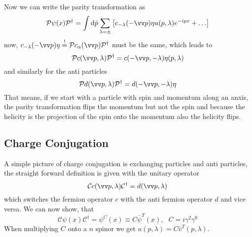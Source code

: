 Now we can write the parity transformation as
\[ \mathcal{P} \psi(x) \mathcal{P}^\dagger = \int \dd \tilde p \sum_{\lambda = \pm} \left[ c_{-\lambda} (-\vp) \eta u(p, \lambda) e^{-ipx} + \ldots\right]\]
now, $c_{-\lambda}(-\vp) \eta \soll \mathcal{P} c_\alpha(\vp) \mathcal{P}^\dagger$ must be the same, which leads to
\[ \mathcal{P} c(\vp , \lambda) \mathcal{P}^\dagger = c(-\vp, -\lambda) \eta(p, \lambda)\]
and similarly for the anti particles
\[ \mathcal{P} d( \vp, \lambda) \mathcal{P}^\dagger = d(-\vp, -\lambda) \eta\]
That means, if we start  with a particle with spin and momentum along an anxis, the parity transformation flips the momentum but not the spin and because the helicity is the projection of the spin onto the momentum also the helicity flips.

\subsection{Charge Conjugation}
A simple picture of charge conjugation is exchanging particles and anti particles, the straight forward definition is given with the unitary operator 
\[ \mathcal{C} c(\vp, \lambda) \mathcal{C}^\dagger = d(\vp, \lambda)\]
which switches the fermion operator $c$ with the anti fermion operator $d$ and vice versa.
We can now show, that
\[ \mathcal{C} \psi(x) \mathcal{C}^\dagger = \psi^C(x) \equiv C \bar \psi^T(x), ~~~ C = i \gamma^2 \gamma^0\]
When multiplying $C$ onto a $n$ spinor we get $u(p, \lambda) = C \bar v ^T(p, \lambda)$.
